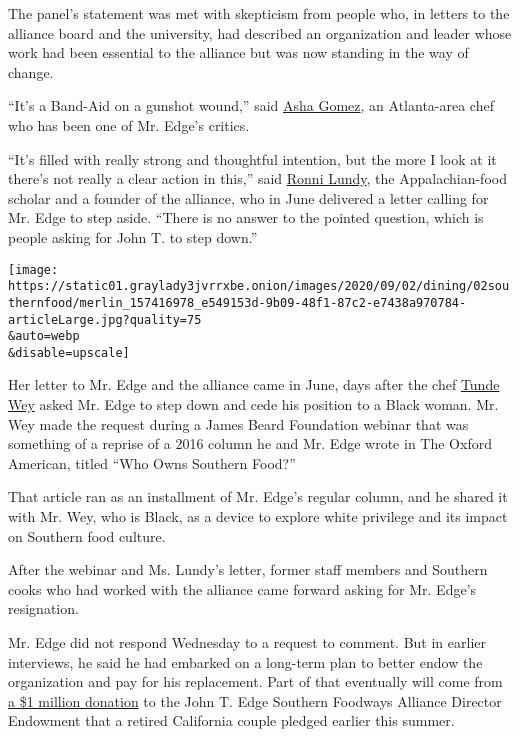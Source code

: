 The panel's statement was met with skepticism from people who, in
letters to the alliance board and the university, had described an
organization and leader whose work had been essential to the alliance
but was now standing in the way of change.

``It's a Band-Aid on a gunshot wound,'' said
\href{https://www.nytimes3xbfgragh.onion/2017/06/06/dining/chef-asha-gomez-india.html}{Asha
Gomez}, an Atlanta-area chef who has been one of Mr. Edge's critics.

``It's filled with really strong and thoughtful intention, but the more
I look at it there's not really a clear action in this,'' said
\href{https://www.southernfoodways.org/interview/ronni-lundy/}{Ronni
Lundy}, the Appalachian-food scholar and a founder of the alliance, who
in June delivered a letter calling for Mr. Edge to step aside. ``There
is no answer to the pointed question, which is people asking for John T.
to step down.''

\texttt{[image: https://static01.graylady3jvrrxbe.onion/images/2020/09/02/dining/02southernfood/merlin\_157416978\_e549153d-9b09-48f1-87c2-e7438a970784-articleLarge.jpg?quality=75\\\&auto=webp\\\&disable=upscale]}

Her letter to Mr. Edge and the alliance came in June, days after the
chef
\href{https://www.nytimes3xbfgragh.onion/interactive/2019/07/16/dining/black-chefs-restaurants-food.html}{Tunde
Wey} asked Mr. Edge to step down and cede his position to a Black woman.
Mr. Wey made the request during a James Beard Foundation webinar that
was something of a reprise of a 2016 column he and Mr. Edge wrote in The
Oxford American, titled ``Who Owns Southern Food?''

That article ran as an installment of Mr. Edge's regular column, and he
shared it with Mr. Wey, who is Black, as a device to explore white
privilege and its impact on Southern food culture.

After the webinar and Ms. Lundy's letter, former staff members and
Southern cooks who had worked with the alliance came forward asking for
Mr. Edge's resignation.

Mr. Edge did not respond Wednesday to a request to comment. But in
earlier interviews, he said he had embarked on a long-term plan to
better endow the organization and pay for his replacement. Part of that
eventually will come from
\href{https://news.olemiss.edu/gift-helps-ensure-success-for-the-southern-foodways-alliance/}{a
\$1 million donation} to the John T. Edge Southern Foodways Alliance
Director Endowment that a retired California couple pledged earlier this
summer.

